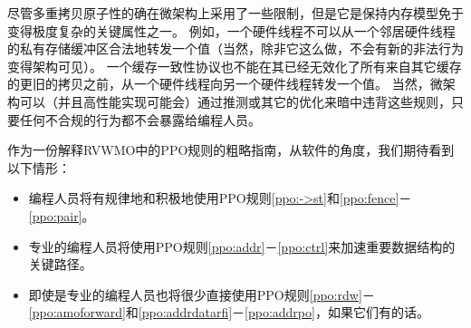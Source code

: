 尽管多重拷贝原子性的确在微架构上采用了一些限制，但是它是保持内存模型免于变得极度复杂的关键属性之一。
例如，一个硬件线程不可以从一个邻居硬件线程的私有存储缓冲区合法地转发一个值（当然，除非它这么做，不会有新的非法行为变得架构可见）。
一个缓存一致性协议也不能在其已经无效化了所有来自其它缓存的更旧的拷贝之前，从一个硬件线程向另一个硬件线程转发一个值。
当然，微架构可以（并且高性能实现可能会）通过推测或其它的优化来暗中违背这些规则，只要任何不合规的行为都不会暴露给编程人员。

作为一份解释RVWMO中的PPO规则的粗略指南，从软件的角度，我们期待看到以下情形：
\begin{itemize}
  \item 编程人员将有规律地和积极地使用PPO规则\ref{ppo:->st}和\ref{ppo:fence}－\ref{ppo:pair}。
  \item 专业的编程人员将使用PPO规则\ref{ppo:addr}－\ref{ppo:ctrl}来加速重要数据结构的关键路径。
  \item 即使是专业的编程人员也将很少直接使用PPO规则\ref{ppo:rdw}－\ref{ppo:amoforward}和\ref{ppo:addrdatarfi}－\ref{ppo:addrpo}，如果它们有的话。
\end{itemize}

